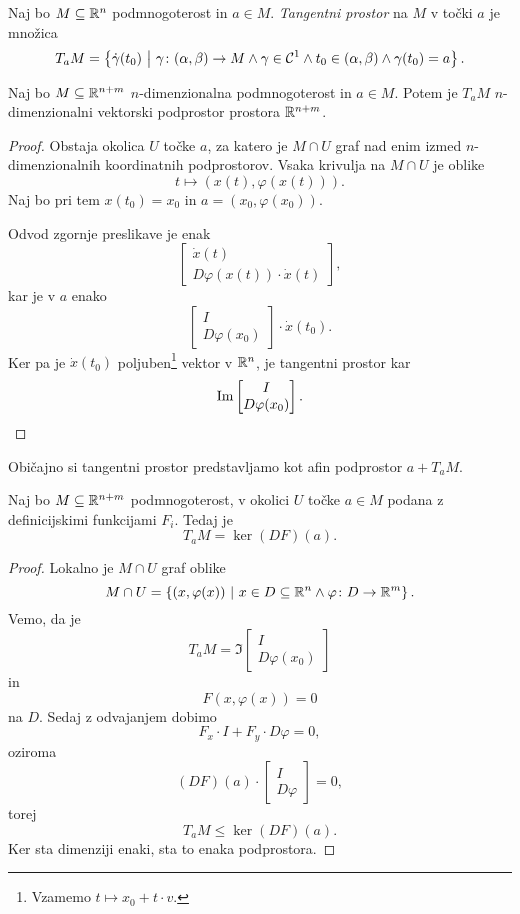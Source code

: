 \begin{definicija}
Naj bo $M \subseteq \R^n$ podmnogoterost in $a \in M$.
\emph{Tangentni prostor} na
$M$ v točki $a$ je množica
\[
T_aM = \setb{\dot{\gamma}(t_0)}
{\gamma \colon (\alpha, \beta) \to M \land
\gamma \in \mathcal{C}^1
\land t_0 \in (\alpha, \beta) \land
\gamma(t_0) = a}.
\]
\end{definicija}

\begin{trditev}
Naj bo $M \subseteq \R^{n+m}$ $n$-dimenzionalna podmnogoterost in
$a \in M$. Potem je $T_aM$ $n$-dimenzionalni vektorski podprostor
prostora $\R^{n+m}$.
\end{trditev}

\begin{proof}
Obstaja okolica $U$ točke $a$, za katero je $M \cap U$ graf nad
enim izmed $n$-dimen\-zionalnih koordinatnih podprostorov. Vsaka
krivulja na $M \cap U$ je oblike
\[
t \mapsto (x(t), \varphi(x(t))).
\]
Naj bo pri tem $x(t_0) = x_0$ in $a = (x_0, \varphi(x_0))$.

Odvod zgornje preslikave je enak
\[
\begin{bmatrix}
\dot{x}(t) \\
D\varphi(x(t)) \cdot \dot{x}(t)
\end{bmatrix},
\]
kar je v $a$ enako
\[
\begin{bmatrix}
I \\
D\varphi(x_0)
\end{bmatrix}
\cdot \dot{x}(t_0).
\]
Ker pa je $\dot{x}(t_0)$ poljuben\footnote{Vzamemo
$t \mapsto x_0 + t \cdot v$.} vektor v $\R^n$, je tangentni prostor
kar
\[
\Im
\begin{bmatrix}
I \\
D\varphi(x_0)
\end{bmatrix}. \qedhere
\]
\end{proof}

\begin{opomba}
Običajno si tangentni prostor predstavljamo kot afin podprostor
$a + T_aM$.
\end{opomba}

\begin{posledica}
Naj bo $M \subseteq \R^{n+m}$ podmnogoterost, v okolici $U$ točke
$a \in M$ podana z definicijskimi funkcijami $F_i$. Tedaj je
\[
T_aM = \ker(DF)(a).
\]
\end{posledica}

\begin{proof}
Lokalno je $M \cap U$ graf oblike
\[
M \cap U = \setb{(x, \varphi(x))}
{x \in D \subseteq \R^n \land \varphi \colon D \to \R^m}.
\]
Vemo, da je
\[
T_aM = \Im
\begin{bmatrix}
I \\
D\varphi(x_0)
\end{bmatrix}
\]
in
\[
F(x, \varphi(x)) = 0
\]
na $D$. Sedaj z odvajanjem dobimo
\[
F_x \cdot I + F_y \cdot D\varphi = 0,
\]
oziroma
\[
(DF)(a) \cdot
\begin{bmatrix}
I \\
D\varphi
\end{bmatrix}
= 0,
\]
torej
\[
T_aM \leq \ker(DF)(a).
\]
Ker sta dimenziji enaki, sta to enaka podprostora.
\end{proof}

